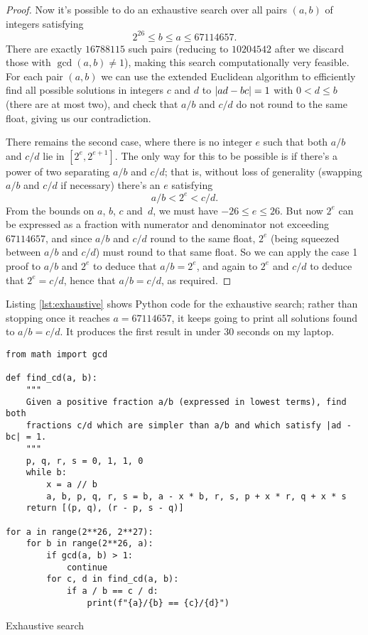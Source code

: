 \documentclass[a4paper]{article}
\DeclarePairedDelimiter\abs{\lvert}{\rvert}
\theoremstyle{plain}
\begin{document}
\begin{proof}
    Now it's possible to do an exhaustive search over all pairs $(a, b)$ of
    integers satisfying
    \[2^{26} \le b \le a \le 67114657.\] There are exactly $16788115$ such
    pairs (reducing to $10204542$ after we discard those with $\gcd(a, b) \ne
    1$), making this search computationally very feasible. For each pair $(a,
    b)$ we can use the extended Euclidean algorithm to efficiently find all
    possible solutions in integers $c$ and $d$ to $\abs{ad - bc} = 1$ with $0 <
    d \le b$ (there are at most two), and check that $a/b$ and $c/d$ do not
    round to the same float, giving us our contradiction.

    There remains the second case, where there is no integer $e$ such that
    both $a/b$ and $c/d$ lie in $[2^e, 2^{e+1}]$. The only way for this to
    be possible is if there's a power of two separating $a/b$ and $c/d$; that
    is, without loss of generality (swapping $a/b$ and $c/d$ if necessary)
    there's an $e$ satisfying
    \[a/b < 2^e < c/d.\]
    From the bounds on $a$, $b$, $c$ and~$d$, we must have
    $-26 \le e \le 26$. But now $2^e$ can be expressed as a fraction with
    numerator and denominator not exceeding $67114657$, and since $a/b$ and
    $c/d$ round to the same float, $2^e$ (being squeezed between $a/b$ and
    $c/d$) must round to that same float. So we can apply the case 1 proof to
    $a/b$ and $2^e$ to deduce that $a/b = 2^e$, and again to $2^e$ and $c/d$ to
    deduce that $2^e = c/d$, hence that $a/b = c/d$, as required.
\end{proof}

Listing \ref{lst:exhaustive} shows Python code for the exhaustive search;
rather than stopping once it reaches $a = 67114657$, it keeps going to print
all solutions found to $a/b = c/d$. It produces the first result in under 30
seconds on my laptop.

\begin{listing}
\begin{verbatim}
from math import gcd

def find_cd(a, b):
    """
    Given a positive fraction a/b (expressed in lowest terms), find both
    fractions c/d which are simpler than a/b and which satisfy |ad - bc| = 1.
    """
    p, q, r, s = 0, 1, 1, 0
    while b:
        x = a // b
        a, b, p, q, r, s = b, a - x * b, r, s, p + x * r, q + x * s
    return [(p, q), (r - p, s - q)]

for a in range(2**26, 2**27):
    for b in range(2**26, a):
        if gcd(a, b) > 1:
            continue
        for c, d in find_cd(a, b):
            if a / b == c / d:
                print(f"{a}/{b} == {c}/{d}")
\end{verbatim}
\caption{Exhaustive search}
\label{lst:exhaustive}
\end{listing}
\end{document}
